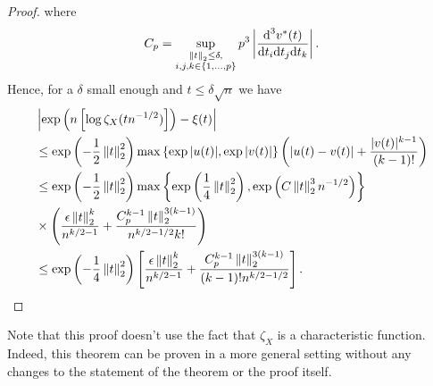 \begin{proof}
    where
    \begin{equation*}
        C_p = \sup_{\substack{\left\lVert t\right\rVert_2 \leq \delta, \\ i,j,k \in \{1,\ldots,p\}}} p^3\left| \frac{\text{d}^3v^*(t)}{\text{d}t_i\text{d}t_j\text{d}t_k}\right|.
    \end{equation*}
    Hence, for a $\delta$ small enough and $t \leq \delta\sqrt{n}$ we have
    \begin{align*}
        &\left|\exp\left(n\left[\log \zeta_X(t n^{-1/2})\right]\right) - \xi(t)\right| \\
        &\leq \exp\left(-\frac{1}{2}\left\lVert t\right\rVert_2^2\right) \max \left\{ \exp{|u(t)|}, \exp{|v(t)|} \right\}\left(\left|u(t) - v(t)\right| + \frac{|v(t)|^{k-1}}{(k-1)!}\right)\\
        &\leq \exp\left(-\frac{1}{2}\left\lVert t\right\rVert_2^2\right)
            \max \left\{ 
                \exp\left(\frac{1}{4}\left\lVert t\right\rVert_2^2\right),
                \exp\left(C \left\lVert t\right\rVert_2^3 n^{-1/2}\right)
            \right\}\\
        & \times \left(
                \frac{\epsilon\left\lVert t\right\rVert_2^k}{n^{k/2-1}}
                +
                \frac{C_p^{k-1} \left\lVert t\right\rVert_2^{3(k-1)} }{n^{k/2-1/2} k!}
              \right)\\
        & \leq \exp\left(-\frac{1}{4}\left\lVert t\right\rVert_2^2\right)\left[ \frac{\epsilon\left\lVert t\right\rVert_2^k}{n^{k/2-1}} + \frac{C_p^{k-1}\left\lVert t\right\rVert_2^{3(k-1)}}{(k-1)!n^{k/2-1/2}} \right].
    \end{align*}
\end{proof}

Note that this proof doesn't use the fact that $\zeta_X$ is a characteristic function. Indeed, this theorem can be proven in a more general setting without any changes to the statement of the theorem or the proof itself.